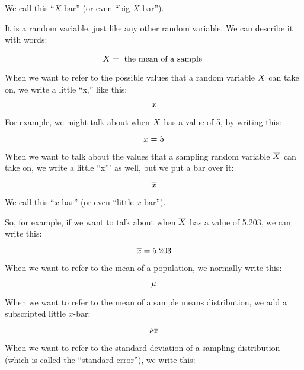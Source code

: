\documentclass[../../../main.tex]{subfiles}
\begin{document}
\noindent
We call this ``$X$-bar'' (or even ``big $X$-bar''). 

It is a random variable, just like any other random variable. We can describe it with words:

\begin{equation*}
  \SamplingRandVar/ = \text{ the mean of a sample }
\end{equation*}

\noindent
When we want to refer to the possible values that a random variable $\RandVar/$ can take on, we write a little ``x,'' like this:

\begin{equation*}
  \RandVarVal/
\end{equation*}

\noindent
For example, we might talk about when $\RandVar/$ has a value of 5, by writing this:

\begin{equation*}
  \RandVarVal/ = 5
\end{equation*}

\noindent
When we want to talk about the values that a sampling random variable $\SamplingRandVar/$ can take on, we write a little ``x''' as well, but we put a bar over it:

\begin{equation*}
  \SamplingRandVarVal/
\end{equation*}

\noindent
We call this ``$x$-bar'' (or even ``little $x$-bar'').

So, for example, if we want to talk about when $\SamplingRandVar/$ has a value of 5.203, we can write this:

\begin{equation*}
  \SamplingRandVarVal/ = 5.203
\end{equation*}

\noindent
When we want to refer to the mean of a population, we normally write this:

\begin{equation*}
  \mu
\end{equation*}

\noindent
When we want to refer to the mean of a sample means distribution, we add a subscripted little $x$-bar:

\begin{equation*}
  \SamplingMean/
\end{equation*}

\noindent
When we want to refer to the standard deviation of a sampling distribution (which is called the ``standard error''), we write this:
\end{document}
